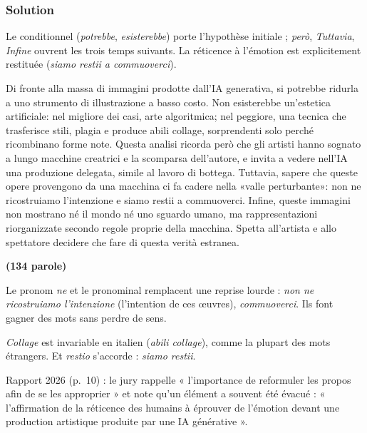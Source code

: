 \documentclass[11pt,a4paper]{article}
\begin{document}
\hypertarget{solution-8}{%
\subsubsection{Solution}\label{solution-8}}

Le conditionnel (\emph{potrebbe}, \emph{esisterebbe}) porte l'hypothèse initiale ; \emph{però}, \emph{Tuttavia}, \emph{Infine} ouvrent les trois temps suivants. La réticence à l'émotion est explicitement restituée (\emph{siamo restii a commuoverci}).

Di fronte alla massa di immagini prodotte dall'IA generativa, si potrebbe ridurla a uno strumento di illustrazione a basso costo. Non esisterebbe un'estetica artificiale: nel migliore dei casi, arte algoritmica; nel peggiore, una tecnica che trasferisce stili, plagia e produce abili collage, sorprendenti solo perché ricombinano forme note. Questa analisi ricorda però che gli artisti hanno sognato a lungo macchine creatrici e la scomparsa dell'autore, e invita a vedere nell'IA una produzione delegata, simile al lavoro di bottega. Tuttavia, sapere che queste opere provengono da una macchina ci fa cadere nella «valle perturbante»: non ne ricostruiamo l'intenzione e siamo restii a commuoverci. Infine, queste immagini non mostrano né il mondo né uno sguardo umano, ma rappresentazioni riorganizzate secondo regole proprie della macchina. Spetta all'artista e allo spettatore decidere che fare di questa verità estranea.

\textbf{(134 parole)}

\begin{methode}

Le pronom \emph{ne} et le pronominal remplacent une reprise lourde : \emph{non ne ricostruiamo l'intenzione} (l'intention de ces œuvres), \emph{commuoverci}. Ils font gagner des mots sans perdre de sens.

\end{methode}

\begin{piege}

\emph{Collage} est invariable en italien (\emph{abili collage}), comme la plupart des mots étrangers. Et \emph{restio} s'accorde : \emph{siamo restii}.

\end{piege}

\begin{jury}

Rapport 2026 (p.~10) : le jury rappelle « l'importance de reformuler les propos afin de se les approprier » et note qu'un élément a souvent été évacué : « l'affirmation de la réticence des humains à éprouver de l'émotion devant une production artistique produite par une IA générative ».

\end{jury}
\end{document}
